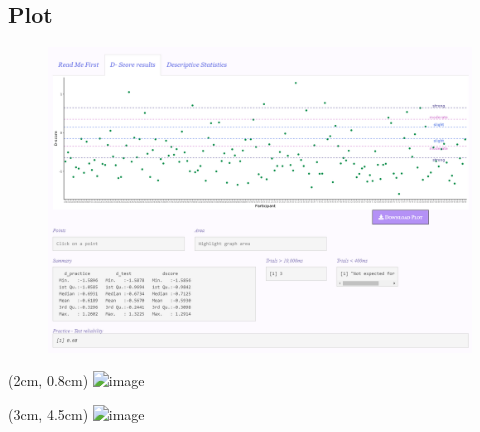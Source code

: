 \documentclass[10pt]{beamer}
\begin{document}
\subsection{Plot} 
\begin{frame}
\begin{figure}
\includegraphics[width=\linewidth]{results.png}
\end{figure}

\begin{textblock*}{10cm}(2cm, 0.8cm)
{\includegraphics<2->[width=0.8\linewidth]{points.png}}
\end{textblock*}

\begin{textblock*}{10cm}(3cm, 4.5cm)
{\includegraphics<3->[width=0.8\linewidth]{area.png}}
\end{textblock*}
\end{frame}
\end{document}
